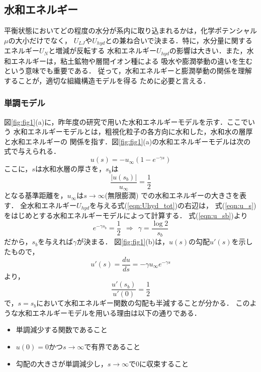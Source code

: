 \subsection{水和エネルギー}
平衡状態においてどの程度の水分が系内に取り込まれるかは，化学ポテンシャル$\mu$の大小だけでなく，
$U_{LJ}$や$U_{hyd}$との兼ね合いで決まる．特に，水分量に関するエネルギー$U_N$と増減が反転する
水和エネルギー$U_{hyd}$の影響は大きい．また，水和エネルギーは，粘土鉱物や層間イオン種による
吸水や膨潤挙動の違いを生むという意味でも重要である．
従って，水和エネルギーと膨潤挙動の関係を理解することが，適切な組織構造モデルを得る
ために必要と言える．
%
\subsubsection{単調モデル}
図\ref{fig:fig1}(a)に，昨年度の研究で用いた水和エネルギーモデルを示す．ここでいう
水和エネルギーモデルとは，粗視化粒子の各方向に水和した，水和水の層厚と水和エネルギーの
関係を指す．図\ref{fig:fig1}(a)の水和エネルギーモデルは次の式で与えられる．
\begin{equation}
	u(s)=-u_{\infty} \left(1-e^{-\gamma s} \right)
	\label{eqn:u_s}
\end{equation}
ここに，$s$は水和水層の厚さを，$s_b$は
\begin{equation}
	\frac{\left| u(s_b) \right|}{u_{\infty}}=\frac{1}{2}
	\label{eqn:u_sb}
\end{equation}
となる基準距離を，$u_{\infty}$は$s\rightarrow \infty$(無限膨潤)
での水和エネルギーの大きさを表す．
全水和エネルギー$U_{hyd}$を与える式(\ref{eqn:Uhyd_tot})の右辺は，
式(\ref{eqn:u_s})をはじめとする水和エネルギーモデルによって計算する．
式(\ref{eqn:u_sb})より
\begin{equation}
	e^{-\gamma s_b}=\frac{1}{2} \ \ \Rightarrow \ \
	\gamma=\frac{\log 2}{s_b}
	\label{eqn:}
\end{equation}
だから，$s_b$を与えれば$\gamma$が決まる．
図\ref{fig:fig1}(b)は，$u(s)$の勾配$u'(s)$を示したもので，
\begin{equation}
	u'(s)=\frac{du}{ds}=-\gamma u_{\infty} e^{-\gamma s}
	\label{eqn:ud_s}
\end{equation}
より，
\begin{equation}
	\frac{u'(s_b)}{u'(0)}=\frac{1}{2}
	\label{eqn:ud_half}
\end{equation}
で，$s=s_b$において水和エネルギー関数の勾配も半減することが分かる．
このような水和エネルギーモデルを用いる理由は以下の通りである．
\begin{itemize}
\item
	単調減少する関数であること
\item
	$u(0)=0$かつ$s\rightarrow \infty$で有界であること
\item
	勾配の大きさが単調減少し，$s\rightarrow \infty$で0に収束すること
\end{itemize}
